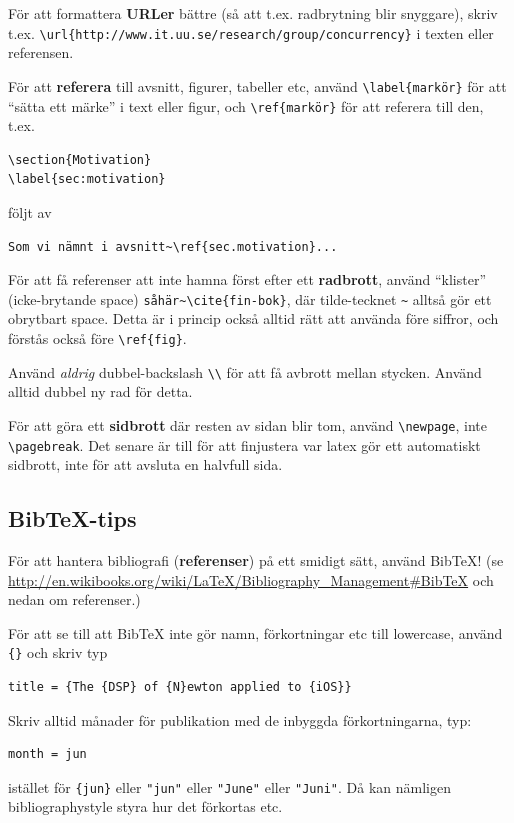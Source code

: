 \documentclass[a4paper,12pt]{article}
\begin{document}
För att formattera \textbf{URLer} bättre (så att t.ex. radbrytning blir snyggare), skriv t.ex. \verb|\url{http://www.it.uu.se/research/group/concurrency}| i texten eller referensen.

För att \textbf{referera} till avsnitt, figurer, tabeller etc, använd \verb|\label{markör}| för att ``sätta ett märke'' i text eller figur, och \verb|\ref{markör}| för att referera till den, t.ex.
\begin{verbatim}
\section{Motivation}
\label{sec:motivation}
\end{verbatim}

följt av
\begin{verbatim}
Som vi nämnt i avsnitt~\ref{sec.motivation}...
\end{verbatim}

För att få referenser att inte hamna först efter ett \textbf{radbrott}, använd ``klister'' (icke-brytande space) \verb|såhär~\cite{fin-bok}|, där tilde-tecknet \verb|~| alltså gör ett obrytbart space. Detta är i princip också alltid rätt att använda före siffror, och förstås också före \verb|\ref{fig}|.

Använd \emph{aldrig} dubbel-backslash \verb|\\| för att få avbrott mellan stycken. Använd alltid dubbel ny rad för detta.

För att göra ett \textbf{sidbrott} där resten av sidan blir tom, använd \verb|\newpage|, inte \verb|\pagebreak|. Det senare är till för att finjustera var latex gör ett automatiskt sidbrott, inte för att avsluta en halvfull sida.

\subsection{Bib\TeX-tips}

För att hantera bibliografi (\textbf{referenser}) på ett smidigt sätt, använd BibTeX! (se \url{http://en.wikibooks.org/wiki/LaTeX/Bibliography_Management#BibTeX} och nedan om referenser.)

För att se till att BibTeX inte gör namn, förkortningar etc till lowercase, använd \verb|{}| och skriv typ
\begin{verbatim}
title = {The {DSP} of {N}ewton applied to {iOS}}
\end{verbatim}

Skriv alltid månader för publikation med de inbyggda förkortningarna, typ:
\begin{verbatim}
month = jun
\end{verbatim}
istället för \verb|{jun}| eller \verb|"jun"| eller \verb|"June"| eller \verb|"Juni"|. Då kan nämligen bibliographystyle styra hur det förkortas etc.
\end{document}
